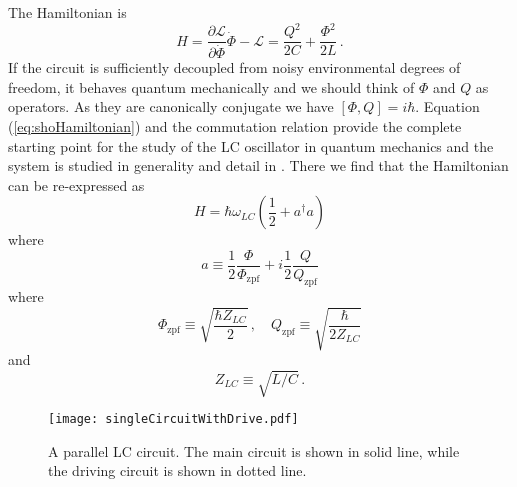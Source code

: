 The Hamiltonian is
\begin{equation}
H = \frac{\partial \mathcal{L}}{\partial \dot{\Phi}} \dot{\Phi} - \mathcal{L}
= \frac{Q^2}{2C} + \frac{\Phi^2}{2L} \, . \label{eq:shoHamiltonian}
\end{equation}
If the circuit is sufficiently decoupled from noisy environmental degrees of freedom, it behaves quantum mechanically and we should think of $\Phi$ and $Q$ as operators.
As they are canonically conjugate we have $[\Phi,Q]=i\hbar$.
Equation (\ref{eq:shoHamiltonian}) and the commutation relation provide the complete starting point for the study of the LC oscillator in quantum mechanics and the system is studied in generality and detail in \citeinternaltype {}.
There we find that the Hamiltonian can be re-expressed as
\begin{equation}
H = \hbar \omega_{LC} \left( \frac{1}{2} + a^\dagger a \right)
\end{equation}
where
\begin{equation}
a \equiv
\frac{1}{2} \frac{\Phi}{\Phi_\text{zpf}}
+ i \frac{1}{2} \frac{Q}{Q_\text{zpf}}
\end{equation}
where
\begin{equation}
\Phi_\text{zpf} \equiv \sqrt{\frac{\hbar Z_{LC}}{2}} \, ,
\quad
Q_\text{zpf} \equiv \sqrt{\frac{\hbar}{2 Z_{LC}}}
\end{equation}
and
\begin{equation}
Z_{LC} \equiv \sqrt{L/C} \, .
\end{equation}

\begin{figure}
\begin{centering}
\texttt{[image: singleCircuitWithDrive.pdf]} 
\par\end{centering}
\caption{A parallel LC circuit. The main circuit is shown in solid line, while the driving circuit is shown in dotted line.}
\label{Fig:singleCircuit}
\end{figure}


